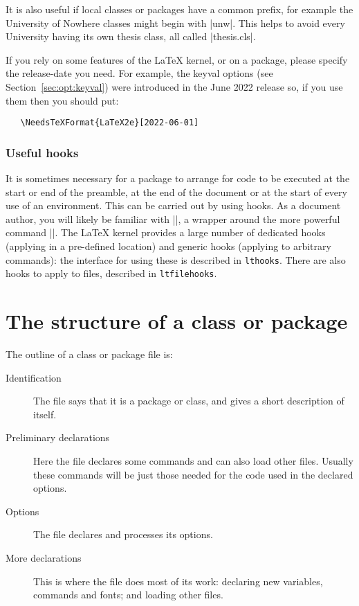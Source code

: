 \documentclass{ltxguide}
\begin{document}
It is also useful if local classes or packages have a common prefix, for
example the University of Nowhere classes might begin with |unw|. This helps to
avoid every University having its own thesis class, all called |thesis.cls|.

If you rely on some features of the \LaTeX{} kernel, or on a package,
please specify the release-date you need.  For example, the keyval
options (see Section~\ref{sec:opt:keyval}) were introduced in the June
2022 release so, if you use them then you should put:
\begin{verbatim}
   \NeedsTeXFormat{LaTeX2e}[2022-06-01]
\end{verbatim}

\subsubsection{Useful hooks}

It is sometimes necessary for a package to arrange for code to be
executed at the start or end of the preamble, at the end of the document
or at the start of every use of an environment. This can be carried
out by using hooks. As a document author, you will likely be familiar with
|\AtBeginDocument|, a wrapper around the more powerful command |\AddToHook|.
The \LaTeX{} kernel provides a large number of dedicated hooks (applying in
a pre-defined location) and generic hooks (applying to arbitrary commands):
the interface for using these is described in \texttt{lthooks}. There are
also hooks to apply to files, described in \texttt{ltfilehooks}.

\section{The structure of a class or package}
\label{sec:structure}

The outline of a class or package file is:
\begin{description}
\item[Identification] The file says that it is a \LaTeXe{} package or
   class, and gives a short description of itself.
\item[Preliminary declarations]
   Here the file declares some commands and can also load
   other files.  Usually these commands will be just those needed for
   the code used in the declared options.
\item[Options] The file declares and processes its options.
\item[More declarations] This is where the file does most of its work:
   declaring new variables, commands and fonts; and loading other files.
\end{description}
\end{document}
